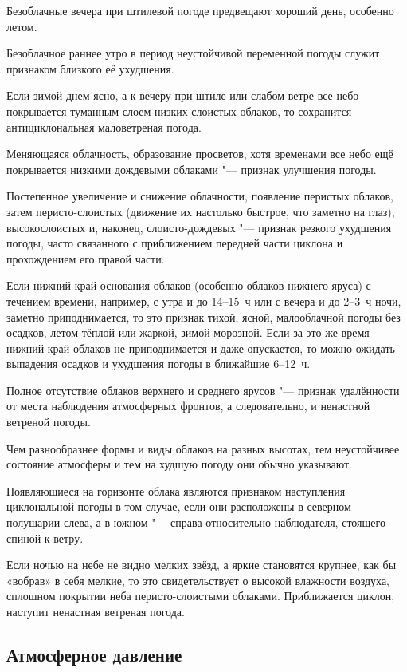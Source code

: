  Безоблачные вечера при штилевой погоде предвещают хороший день,
особенно летом.

 Безоблачное раннее утро в период неустойчивой переменной погоды
служит признаком близкого её ухудшения.

 Если зимой днем ясно, а к вечеру при штиле или слабом ветре все
небо покрывается туманным слоем низких слоистых облаков, то сохранится
антициклональная маловетреная погода.

 Меняющаяся облачность, образование просветов, хотя временами
все небо ещё покрывается низкими дождевыми облаками "--- признак
улучшения погоды.

 Постепенное увеличение и снижение облачности, появление
перистых облаков, затем перисто-слоистых (движение их настолько
быстрое, что заметно на глаз), высокослоистых и, наконец,
слоисто-дождевых "--- признак резкого ухудшения погоды, часто
связанного с приближением передней части циклона и прохождением его
правой части.

 Если нижний край основания облаков (особенно облаков нижнего
яруса) с течением времени, например, с утра и до 14--15~ч или с вечера
и до 2--3~ч ночи, заметно приподнимается, то это признак тихой, ясной,
малооблачной погоды без осадков, летом тёплой или жаркой, зимой
морозной. Если за это же время нижний край облаков не приподнимается и
даже опускается, то можно ожидать выпадения осадков и ухудшения погоды
в ближайшие 6--12~ч.

 Полное отсутствие облаков верхнего и среднего ярусов "--- признак
удалённости от места наблюдения атмосферных фронтов, а следовательно,
и ненастной ветреной погоды.

 Чем разнообразнее формы и виды облаков на разных высотах, тем
неустойчивее состояние атмосферы и тем на худшую погоду они обычно
указывают.

 Появляющиеся на горизонте облака являются признаком наступления
циклональной погоды в том случае, если они расположены в северном
полушарии слева, а в южном "--- справа относительно наблюдателя, стоящего
спиной к ветру.

 Если ночью на небе не видно мелких звёзд, а яркие становятся
крупнее, как бы «вобрав» в себя мелкие, то это свидетельствует о
высокой влажности воздуха, сплошном покрытии неба перисто-слоистыми
облаками. Приближается циклон, наступит ненастная ветреная погода.

\subsection{Атмосферное давление}

